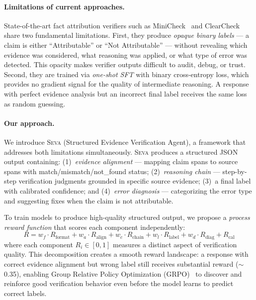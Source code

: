 \documentclass{article}
\newcommand{\seva}{\textsc{Seva}}
\begin{document}
\paragraph{Limitations of current approaches.}
State-of-the-art fact attribution verifiers such as MiniCheck~\citep{tang2024minicheck} and ClearCheck~\citep{seo2025vtv} share two fundamental limitations.
First, they produce \emph{opaque binary labels} --- a claim is either ``Attributable'' or ``Not Attributable'' --- without revealing which evidence was considered, what reasoning was applied, or what type of error was detected.
This opacity makes verifier outputs difficult to audit, debug, or trust.
Second, they are trained via \emph{one-shot SFT} with binary cross-entropy loss, which provides no gradient signal for the quality of intermediate reasoning.
A response with perfect evidence analysis but an incorrect final label receives the same loss as random guessing.

\paragraph{Our approach.}
We introduce \seva{} (Structured Evidence Verification Agent), a framework that addresses both limitations simultaneously.
\seva{} produces a structured JSON output containing: (1)~\emph{evidence alignment} --- mapping claim spans to source spans with match/mismatch/not\_found status; (2)~\emph{reasoning chain} --- step-by-step verification judgments grounded in specific source evidence; (3)~a final label with calibrated confidence; and (4)~\emph{error diagnosis} --- categorizing the error type and suggesting fixes when the claim is not attributable.

To train models to produce high-quality structured output, we propose a \emph{process reward function} that scores each component independently:
\begin{equation}
R = w_f \cdot R_{\text{format}} + w_a \cdot R_{\text{align}} + w_c \cdot R_{\text{chain}} + w_l \cdot R_{\text{label}} + w_d \cdot R_{\text{diag}} + R_{\text{cal}}
\label{eq:reward}
\end{equation}
where each component $R_i \in [0, 1]$ measures a distinct aspect of verification quality.
This decomposition creates a smooth reward landscape: a response with correct evidence alignment but wrong label still receives substantial reward ($\sim$0.35), enabling Group Relative Policy Optimization (GRPO)~\citep{shao2024deepseekmath} to discover and reinforce good verification behavior even before the model learns to predict correct labels.
\end{document}
